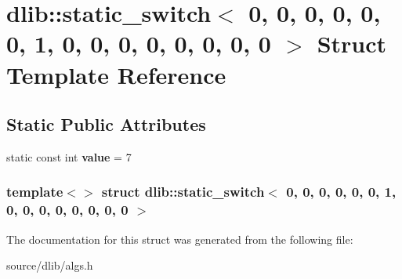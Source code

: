 \hypertarget{structdlib_1_1static__switch_3_010_00_010_00_010_00_010_00_010_00_010_00_011_00_010_00_010_00_01f96a27221d42a17b5e8ff3b09c0ae4ae}{
\section{dlib::static\_\-switch$<$ 0, 0, 0, 0, 0, 0, 1, 0, 0, 0, 0, 0, 0, 0, 0 $>$ Struct Template Reference}
\label{structdlib_1_1static__switch_3_010_00_010_00_010_00_010_00_010_00_010_00_011_00_010_00_010_00_01f96a27221d42a17b5e8ff3b09c0ae4ae}
}
\subsection*{Static Public Attributes}
\begin{DoxyCompactItemize}
\item 
\hypertarget{structdlib_1_1static__switch_3_010_00_010_00_010_00_010_00_010_00_010_00_011_00_010_00_010_00_01f96a27221d42a17b5e8ff3b09c0ae4ae_a80b00d374ef0dcd6b4b750dae750723a}{
static const int {\bfseries value} = 7}
\label{structdlib_1_1static__switch_3_010_00_010_00_010_00_010_00_010_00_010_00_011_00_010_00_010_00_01f96a27221d42a17b5e8ff3b09c0ae4ae_a80b00d374ef0dcd6b4b750dae750723a}

\end{DoxyCompactItemize}
\subsubsection*{template$<$$>$ struct dlib::static\_\-switch$<$ 0, 0, 0, 0, 0, 0, 1, 0, 0, 0, 0, 0, 0, 0, 0 $>$}



The documentation for this struct was generated from the following file:\begin{DoxyCompactItemize}
\item 
source/dlib/algs.h\end{DoxyCompactItemize}
